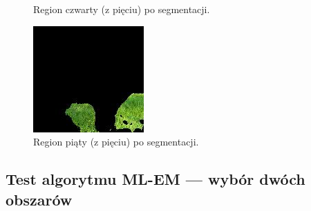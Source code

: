 \documentclass[10pt]{llncs}
\begin{document}
\begin{figure}[!htb]
  \caption{Region czwarty (z pięciu) po segmentacji.}\label{fig:11}
\endminipage\hfill
{}
  \includegraphics[width=\linewidth]{img/images_k5_4.jpg}
  \caption{Region piąty (z pięciu) po segmentacji.}\label{fig:12}
\endminipage
\end{figure}

\clearpage
\subsection{Test algorytmu ML-EM --- wybór dwóch obszarów}
\end{document}
